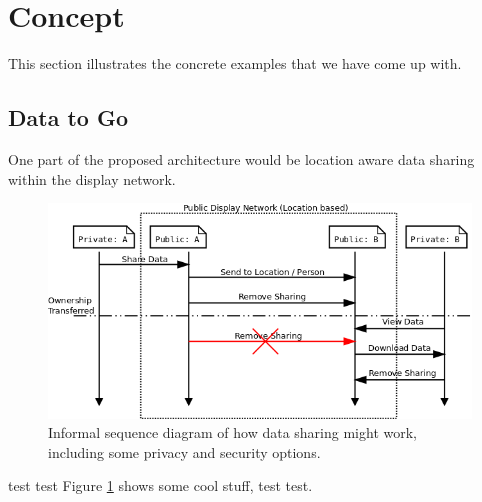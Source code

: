 \section{Concept}

This section illustrates the concrete examples that we have come up with.

\subsection{Data to Go}

One part of the proposed architecture would be location aware data sharing within the display network.

\begin{figure}
	\centering
	\includegraphics[width=\linewidth]{img/data_sharing.png}
	\caption[Data Sharing Sequence]{Informal sequence diagram of how data sharing might work, including some privacy and security options.}
	\label{data_share_sequence}
\end{figure}

test test
Figure \ref{data_share_sequence} shows some cool stuff, test test.
